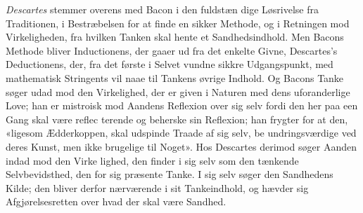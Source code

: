 \documentclass[12pt,a4paper]{book}
\begin{document}
\emph{Descartes} stemmer overens med Bacon i den fuldstæn\-%
dige Løsrivelse fra Traditionen, i Bestræbelsen for at finde
en sikker Methode, og i Retningen mod Virkeligheden, fra
hvilken Tanken skal hente et Sandhedsindhold. Men Bacons
Methode bliver Inductionens, der gaaer ud fra det enkelte
Givne, Descartes's Deductionens, der, fra det første i Selvet
vundne sikkre Udgangspunkt, med mathematisk Stringents vil
naae til Tankens øvrige Indhold. Og Bacons Tanke søger
udad mod den Virkelighed, der er given i Naturen med dens
uforanderlige Love; han er mistroisk mod Aandens Reflexion
over sig selv fordi den her paa een Gang skal være reflec\-%
terende og beherske sin Reflexion; han frygter for at den,
«ligesom Ædderkoppen, skal udspinde Traade af sig selv, be\-%
undringsværdige ved deres Kunst, men ikke brugelige til Noget».
Hos Descartes derimod søger Aanden indad mod den Virke\-%
lighed, den finder i sig selv som den tænkende Selvbevidsthed,
den for sig præsente Tanke. I sig selv søger den Sandhedens
Kilde; den bliver derfor nærværende i sit Tankeindhold, og
hævder sig Afgjørelsesretten over hvad der skal være Sandhed.
\end{document}
